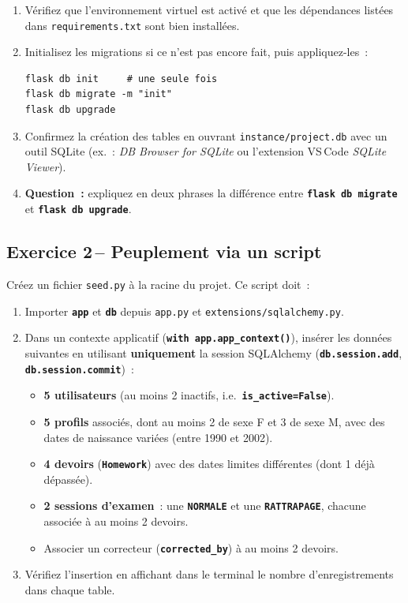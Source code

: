 \documentclass[12pt,a4paper]{article}
\newcommand{\fichier}[1]{\texttt{\textcolor{primary}{#1}}}
\newcommand{\kw}[1]{\texttt{\textbf{#1}}}
\begin{document}
\begin{mdframed}[style=exercice]
\begin{enumerate}[label=\textbf{\arabic*.}]
    \item Vérifiez que l'environnement virtuel est activé et que les dépendances listées dans \fichier{requirements.txt} sont bien installées.
    \item Initialisez les migrations si ce n'est pas encore fait, puis appliquez-les~:
\begin{lstlisting}[numbers=none]
flask db init     # une seule fois
flask db migrate -m "init"
flask db upgrade
\end{lstlisting}
    \item Confirmez la création des tables en ouvrant \fichier{instance/project.db} avec un outil SQLite (ex.~: \textit{DB Browser for SQLite} ou l'extension VS\,Code \textit{SQLite Viewer}).
    \item \textbf{Question~:} expliquez en deux phrases la différence entre \kw{flask db migrate} et \kw{flask db upgrade}.
\end{enumerate}
\end{mdframed}

\subsection{Exercice 2\,– Peuplement via un script}

Créez un fichier \fichier{seed.py} à la racine du projet. Ce script doit~:

\begin{mdframed}[style=exercice]
\begin{enumerate}[label=\textbf{\arabic*.}]
    \item Importer \kw{app} et \kw{db} depuis \fichier{app.py} et \fichier{extensions/sqlalchemy.py}.
    \item Dans un contexte applicatif (\kw{with app.app\_context()}), insérer les données suivantes en utilisant \textbf{uniquement} la session SQLAlchemy (\kw{db.session.add}, \kw{db.session.commit})~:

    \begin{itemize}
        \item \textbf{5 utilisateurs} (au moins 2 inactifs, i.e.\ \kw{is\_active=False}).
        \item \textbf{5 profils} associés, dont au moins 2 de sexe F et 3 de sexe M, avec des dates de naissance variées (entre 1990 et 2002).
        \item \textbf{4 devoirs} (\kw{Homework}) avec des dates limites différentes (dont 1 déjà dépassée).
        \item \textbf{2 sessions d'examen}~: une \kw{NORMALE} et une \kw{RATTRAPAGE}, chacune associée à au moins 2 devoirs.
        \item Associer un correcteur (\kw{corrected\_by}) à au moins 2 devoirs.
    \end{itemize}

    \item Vérifiez l'insertion en affichant dans le terminal le nombre d'enregistrements dans chaque table.
\end{enumerate}
\end{mdframed}
\end{document}
